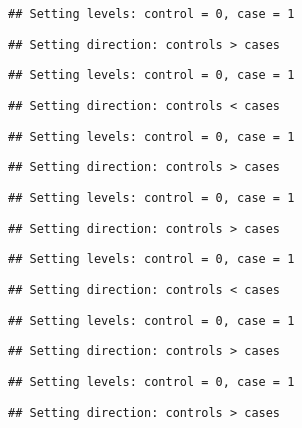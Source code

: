 \documentclass[
]{article}
\begin{document}
\begin{verbatim}
## Setting levels: control = 0, case = 1
\end{verbatim}

\begin{verbatim}
## Setting direction: controls > cases
\end{verbatim}

\begin{verbatim}
## Setting levels: control = 0, case = 1
\end{verbatim}

\begin{verbatim}
## Setting direction: controls < cases
\end{verbatim}

\begin{verbatim}
## Setting levels: control = 0, case = 1
\end{verbatim}

\begin{verbatim}
## Setting direction: controls > cases
\end{verbatim}

\begin{verbatim}
## Setting levels: control = 0, case = 1
\end{verbatim}

\begin{verbatim}
## Setting direction: controls > cases
\end{verbatim}

\begin{verbatim}
## Setting levels: control = 0, case = 1
\end{verbatim}

\begin{verbatim}
## Setting direction: controls < cases
\end{verbatim}

\begin{verbatim}
## Setting levels: control = 0, case = 1
\end{verbatim}

\begin{verbatim}
## Setting direction: controls > cases
\end{verbatim}

\begin{verbatim}
## Setting levels: control = 0, case = 1
\end{verbatim}

\begin{verbatim}
## Setting direction: controls > cases
\end{verbatim}
\end{document}
